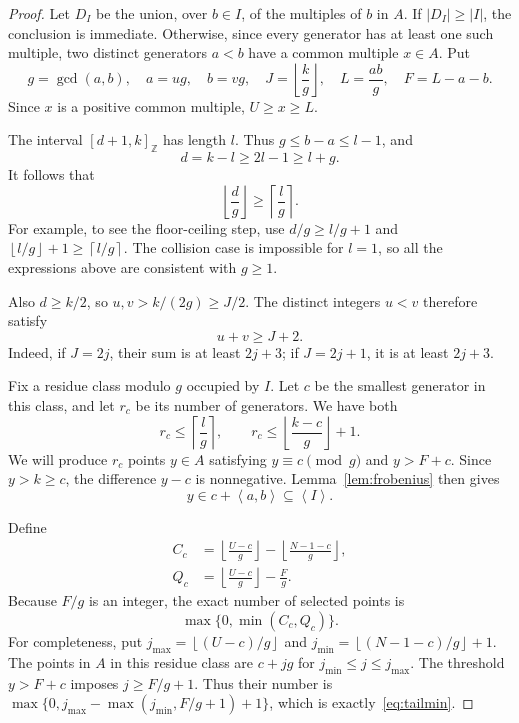 \documentclass[11pt,a4paper]{article}
\numberwithin{equation}{section}
\theoremstyle{remark}
\newcommand{\Z}{\mathbb Z}
\newcommand{\sg}[1]{\left\langle #1\right\rangle}
\newcommand{\floor}[1]{\left\lfloor #1\right\rfloor}
\newcommand{\ceil}[1]{\left\lceil #1\right\rceil}
\newcommand{\interval}[2]{[#1,#2]_{\Z}}
\begin{document}
\begin{proof}
Let $D_I$ be the union, over $b\in I$, of the multiples of $b$ in $A$.
If $|D_I|\ge|I|$, the conclusion is immediate.
Otherwise, since every generator has at least one such multiple, two
distinct generators $a<b$ have a common multiple $x\in A$.
Put
\begin{equation}\label{eq:tailparameters}
  g=\gcd(a,b),\quad a=ug,\quad b=vg,\quad
  J=\floor{\frac{k}{g}},\quad
  L=\frac{ab}{g},\quad F=L-a-b.
\end{equation}
Since $x$ is a positive common multiple, $U\ge x\ge L$.

The interval $\interval{d+1}{k}$ has length $l$. Thus
$g\le b-a\le l-1$, and
\[
  d=k-l\ge2l-1\ge l+g.
\]
It follows that
\begin{equation}\label{eq:tailwidth}
  \floor{\frac{d}{g}}\ge\ceil{\frac{l}{g}}.
\end{equation}
For example, to see the floor-ceiling step, use
$d/g\ge l/g+1$ and
$\floor{l/g}+1\ge\ceil{l/g}$.
The collision case is impossible for $l=1$, so all the expressions
above are consistent with $g\ge1$.

Also $d\ge k/2$, so $u,v>k/(2g)\ge J/2$.
The distinct integers $u<v$ therefore satisfy
\begin{equation}\label{eq:tailsum}
  u+v\ge J+2.
\end{equation}
Indeed, if $J=2j$, their sum is at least $2j+3$; if $J=2j+1$,
it is at least $2j+3$.

Fix a residue class modulo $g$ occupied by $I$.
Let $c$ be the smallest generator in this class, and let $r_c$ be its
number of generators. We have both
\begin{equation}\label{eq:tailrc}
  r_c\le\ceil{\frac{l}{g}},
  \qquad
  r_c\le\floor{\frac{k-c}{g}}+1.
\end{equation}
We will produce $r_c$ points $y\in A$ satisfying
$y\equiv c\pmod g$ and $y>F+c$.
Since $y>k\ge c$, the difference $y-c$ is nonnegative.
Lemma~\ref{lem:frobenius} then gives
\[
  y\in c+\sg{a,b}\subseteq\sg{I}.
\]

Define
\begin{equation}\label{eq:tailcapacities}
  \begin{split}
  C_c&=\floor{\frac{U-c}{g}}-\floor{\frac{N-1-c}{g}},\\
  Q_c&=\floor{\frac{U-c}{g}}-\frac{F}{g}.
  \end{split}
\end{equation}
Because $F/g$ is an integer, the exact number of selected points is
\begin{equation}\label{eq:tailmin}
  \max\{0,\min(C_c,Q_c)\}.
\end{equation}
For completeness, put
$j_{\max}=\floor{(U-c)/g}$ and
$j_{\min}=\floor{(N-1-c)/g}+1$.
The points in $A$ in this residue class are $c+jg$ for
$j_{\min}\le j\le j_{\max}$.
The threshold $y>F+c$ imposes $j\ge F/g+1$.
Thus their number is
$\max\{0,j_{\max}-\max(j_{\min},F/g+1)+1\}$,
which is exactly~\eqref{eq:tailmin}.


\end{proof}
\end{document}
